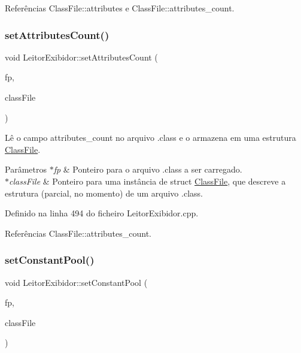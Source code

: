 Referências Class\+File\+::attributes e Class\+File\+::attributes\+\_\+count.

\mbox{\label{classLeitorExibidor_a891dc9f2ceb6f5c337f91a973d2ad6ee}} 
\subsubsection{\texorpdfstring{set\+Attributes\+Count()}{setAttributesCount()}}
{\footnotesize\ttfamily void Leitor\+Exibidor\+::set\+Attributes\+Count (\begin{DoxyParamCaption}\item[{F\+I\+LE $\ast$}]{fp,  }\item[{\hyperlink{classClassFile}{Class\+File} $\ast$}]{class\+File }\end{DoxyParamCaption})\hspace{0.3cm}{\ttfamily [private]}}

Lê o campo attributes\+\_\+count no arquivo .class e o armazena em uma estrutura \hyperlink{classClassFile}{Class\+File}. 
\begin{DoxyParams}{Parâmetros}
{\em $\ast$fp} & Ponteiro para o arquivo .class a ser carregado. \\
\hline
{\em $\ast$class\+File} & Ponteiro para uma instância de struct \hyperlink{classClassFile}{Class\+File}, que descreve a estrutura (parcial, no momento) de um arquivo .class. \\
\hline
\end{DoxyParams}


Definido na linha 494 do ficheiro Leitor\+Exibidor.\+cpp.



Referências Class\+File\+::attributes\+\_\+count.

\mbox{\label{classLeitorExibidor_a34dc148775506753f609e643ac931cac}} 
\subsubsection{\texorpdfstring{set\+Constant\+Pool()}{setConstantPool()}}
{\footnotesize\ttfamily void Leitor\+Exibidor\+::set\+Constant\+Pool (\begin{DoxyParamCaption}\item[{F\+I\+LE $\ast$}]{fp,  }\item[{\hyperlink{classClassFile}{Class\+File} $\ast$}]{class\+File }\end{DoxyParamCaption})\hspace{0.3cm}{\ttfamily [private]}}


